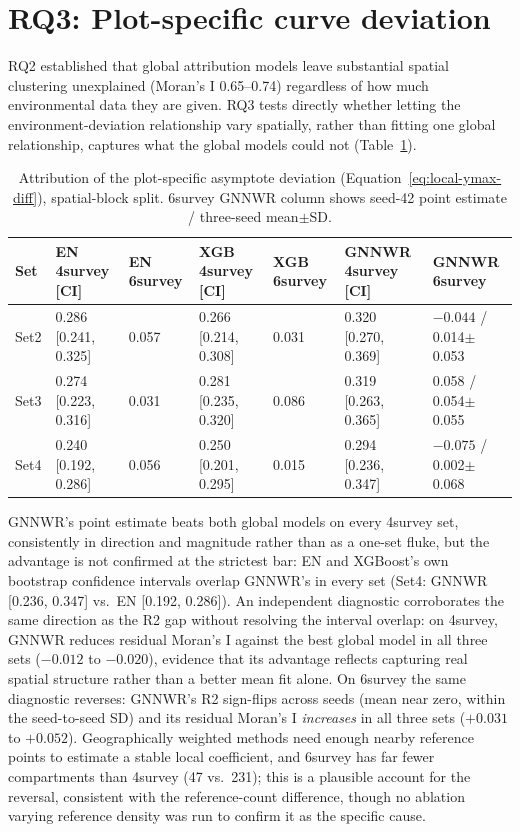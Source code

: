 \documentclass[11pt,a4paper]{report}
\begin{document}

\section{RQ3: Plot-specific curve deviation}
\label{sec:results-rq3}

RQ2 established that global attribution models leave substantial spatial clustering
unexplained (Moran's I 0.65--0.74) regardless of how much environmental data they are
given. RQ3 tests directly whether letting the environment-deviation relationship vary
spatially, rather than fitting one global relationship, captures what the global
models could not (Table~\ref{tab:results-rq3}).

\begin{table}[!htbp]
\centering
\scriptsize
\renewcommand{\arraystretch}{1.2}
\begin{tabular}{lllllll}
\toprule
Set & EN 4survey [CI] & EN 6survey & XGB 4survey [CI] & XGB 6survey & GNNWR 4survey [CI] & GNNWR 6survey \\
\midrule
Set2 & 0.286 [0.241, 0.325] & 0.057 & 0.266 [0.214, 0.308] & 0.031 & 0.320 [0.270, 0.369] & $-0.044$ / 0.014$\pm$0.053 \\
Set3 & 0.274 [0.223, 0.316] & 0.031 & 0.281 [0.235, 0.320] & 0.086 & 0.319 [0.263, 0.365] & 0.058 / 0.054$\pm$0.055 \\
Set4 & 0.240 [0.192, 0.286] & 0.056 & 0.250 [0.201, 0.295] & 0.015 & 0.294 [0.236, 0.347] & $-0.075$ / 0.002$\pm$0.068 \\
\bottomrule
\end{tabular}
\caption{Attribution of the plot-specific asymptote deviation
(Equation~\ref{eq:local-ymax-diff}), spatial-block split. 6survey GNNWR column shows
seed-42 point estimate / three-seed mean$\pm$SD.}
\label{tab:results-rq3}
\end{table}

GNNWR's point estimate beats both global models on every 4survey set, consistently in
direction and magnitude rather than as a one-set fluke, but the advantage is not
confirmed at the strictest bar: EN and XGBoost's own bootstrap confidence intervals
overlap GNNWR's in every set (Set4: GNNWR [0.236, 0.347] vs.\ EN [0.192, 0.286]).
An independent diagnostic corroborates the same direction as the R2 gap without
resolving the interval overlap: on 4survey, GNNWR reduces residual Moran's I against
the best global model in all three sets ($-0.012$ to $-0.020$), evidence that its
advantage reflects capturing real spatial structure rather than a better mean fit
alone. On 6survey the same diagnostic reverses: GNNWR's R2 sign-flips across seeds
(mean near zero, within the seed-to-seed SD) and its residual Moran's I \emph{increases}
in all three sets ($+0.031$ to $+0.052$). Geographically weighted methods need enough
nearby reference points to estimate a stable local coefficient, and 6survey has far
fewer compartments than 4survey (47 vs.\ 231); this is a plausible account for the
reversal, consistent with the reference-count difference, though no ablation varying
reference density was run to confirm it as the specific cause.
\end{document}
